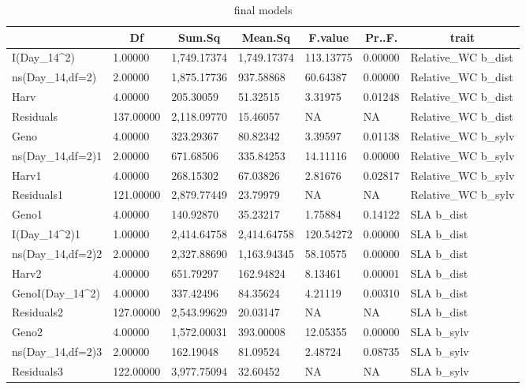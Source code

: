 \documentclass[jou,floatsintext]{apa6}
\begin{document}
\begin{table}[tbp]
\begin{center}
\begin{threeparttable}
\caption{\label{tab:outmodels}final models}
\tiny{
\begin{tabular}{lllllll}
\toprule
 & \multicolumn{1}{c}{Df} & \multicolumn{1}{c}{Sum.Sq} & \multicolumn{1}{c}{Mean.Sq} & \multicolumn{1}{c}{F.value} & \multicolumn{1}{c}{Pr..F.} & \multicolumn{1}{c}{trait}\\
\midrule
I(Day\_14\textasciicircum{}2) & 1.00000 & 1,749.17374 & 1,749.17374 & 113.13775 & 0.00000 & Relative\_WC b\_dist\\
ns(Day\_14,df=2) & 2.00000 & 1,875.17736 & 937.58868 & 60.64387 & 0.00000 & Relative\_WC b\_dist\\
Harv & 4.00000 & 205.30059 & 51.32515 & 3.31975 & 0.01248 & Relative\_WC b\_dist\\
Residuals & 137.00000 & 2,118.09770 & 15.46057 & NA & NA & Relative\_WC b\_dist\\
Geno & 4.00000 & 323.29367 & 80.82342 & 3.39597 & 0.01138 & Relative\_WC b\_sylv\\
ns(Day\_14,df=2)1 & 2.00000 & 671.68506 & 335.84253 & 14.11116 & 0.00000 & Relative\_WC b\_sylv\\
Harv1 & 4.00000 & 268.15302 & 67.03826 & 2.81676 & 0.02817 & Relative\_WC b\_sylv\\
Residuals1 & 121.00000 & 2,879.77449 & 23.79979 & NA & NA & Relative\_WC b\_sylv\\
Geno1 & 4.00000 & 140.92870 & 35.23217 & 1.75884 & 0.14122 & SLA b\_dist\\
I(Day\_14\textasciicircum{}2)1 & 1.00000 & 2,414.64758 & 2,414.64758 & 120.54272 & 0.00000 & SLA b\_dist\\
ns(Day\_14,df=2)2 & 2.00000 & 2,327.88690 & 1,163.94345 & 58.10575 & 0.00000 & SLA b\_dist\\
Harv2 & 4.00000 & 651.79297 & 162.94824 & 8.13461 & 0.00001 & SLA b\_dist\\
GenoI(Day\_14\textasciicircum{}2) & 4.00000 & 337.42496 & 84.35624 & 4.21119 & 0.00310 & SLA b\_dist\\
Residuals2 & 127.00000 & 2,543.99629 & 20.03147 & NA & NA & SLA b\_dist\\
Geno2 & 4.00000 & 1,572.00031 & 393.00008 & 12.05355 & 0.00000 & SLA b\_sylv\\
ns(Day\_14,df=2)3 & 2.00000 & 162.19048 & 81.09524 & 2.48724 & 0.08735 & SLA b\_sylv\\
Residuals3 & 122.00000 & 3,977.75094 & 32.60452 & NA & NA & SLA b\_sylv\\

\end{tabular}}
\end{threeparttable}
\end{center}
\end{table}
\end{document}
